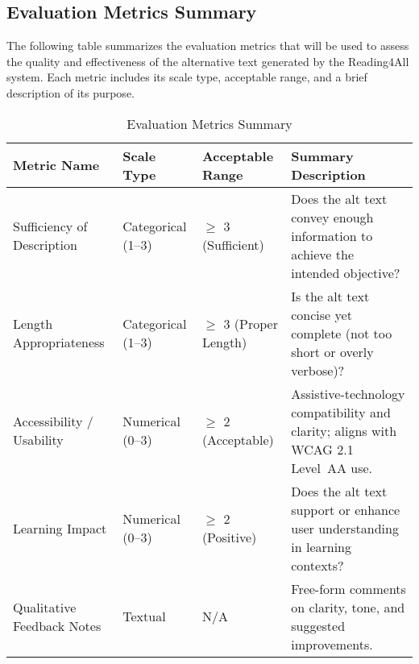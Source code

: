 \documentclass[12pt, titlepage]{article}
\begin{document}
\subsection{Evaluation Metrics Summary}
\label{appendix:evaluation-metrics}
The following table summarizes the evaluation metrics that will be
used to assess the quality and effectiveness of the alternative text
generated by the Reading4All system. Each metric includes its scale
type, acceptable range, and a brief description of its purpose.
\begin{table}[H]
  \centering
  \caption{Evaluation Metrics Summary}
  \label{tab:evaluation-metrics-summary}
  \begin{tabular}{ |p{3.5cm}|p{3cm}|p{3cm}|p{4cm}| }
    \hline
    \textbf{Metric Name} & \textbf{Scale Type} & \textbf{Acceptable
    Range} & \textbf{Summary Description} \\
    \hline
    Sufficiency of Description
    & Categorical (1--3)
    & $\geq$ 3 (Sufficient)
    & Does the alt text convey enough information to achieve the
    intended objective? \\
    \hline
    Length Appropriateness
    & Categorical (1--3)
    & $\geq$ 3 (Proper Length)
    & Is the alt text concise yet complete (not too short or overly verbose)? \\
    \hline
    Accessibility / Usability
    & Numerical (0--3)
    & $\geq$ 2 (Acceptable)
    & Assistive-technology compatibility and clarity; aligns with
    WCAG 2.1 Level~AA use. \\
    \hline
    Learning Impact
    & Numerical (0--3)
    & $\geq$ 2 (Positive)
    & Does the alt text support or enhance user understanding in
    learning contexts? \\
    \hline
    Qualitative Feedback Notes
    & Textual
    & N/A
    & Free-form comments on clarity, tone, and suggested improvements. \\
    \hline
  \end{tabular}
\end{table}
\end{document}
